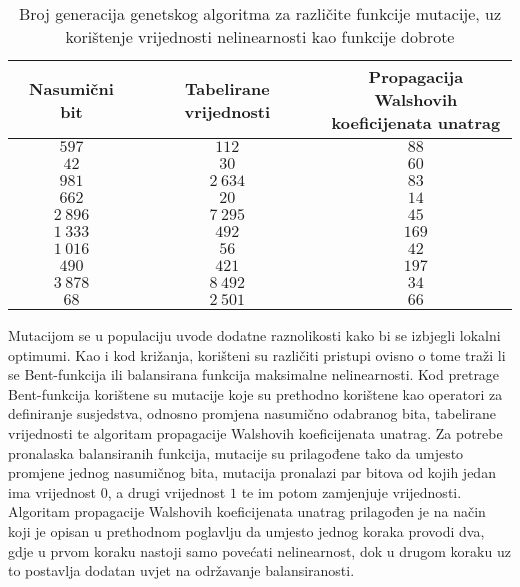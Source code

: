 \begin{table}[]
    \centering
    \begin{tabular}{ccc}
        Nasumični bit & Tabelirane vrijednosti & \makecell{Propagacija Walshovih \\ koeficijenata unatrag} \\ \hline
           $597$ &    $112$ &  $88$ \\
            $42$ &     $30$ &  $60$ \\
           $981$ & $2\:634$ &  $83$ \\
           $662$ &     $20$ &  $14$ \\
        $2\:896$ & $7\:295$ &  $45$ \\
        $1\:333$ &    $492$ & $169$ \\
        $1\:016$ &     $56$ &  $42$ \\
           $490$ &    $421$ & $197$ \\
        $3\:878$ & $8\:492$ &  $34$ \\
            $68$ & $2\:501$ &  $66$
    \end{tabular}
    \captionsetup{justification=centering}
    \caption{Broj generacija genetskog algoritma za različite funkcije mutacije, uz korištenje vrijednosti nelinearnosti kao funkcije dobrote}
    \label{tbl:ga_6_nonl}
\end{table}

Mutacijom se u populaciju uvode dodatne raznolikosti kako bi se izbjegli lokalni optimumi.
Kao i kod križanja, korišteni su različiti pristupi ovisno o tome traži li se Bent-funkcija ili balansirana funkcija maksimalne nelinearnosti.
Kod pretrage Bent-funkcija korištene su mutacije koje su prethodno korištene kao operatori za definiranje susjedstva, odnosno promjena nasumično odabranog bita, tabelirane vrijednosti te algoritam propagacije Walshovih koeficijenata unatrag.
Za potrebe pronalaska balansiranih funkcija, mutacije su prilagođene tako da umjesto promjene jednog nasumičnog bita, mutacija pronalazi par bitova od kojih jedan ima vrijednost $0$, a drugi vrijednost $1$ te im potom zamjenjuje vrijednosti.
Algoritam propagacije Walshovih koeficijenata unatrag prilagođen je na način koji je opisan u prethodnom poglavlju da umjesto jednog koraka provodi dva, gdje u prvom koraku nastoji samo povećati nelinearnost, dok u drugom koraku uz to postavlja dodatan uvjet na održavanje balansiranosti.

